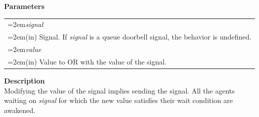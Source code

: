 \documentclass[final]{book}
\newcommand{\hsaarg}[1]{\textit{#1}}
\begin{document}
\noindent\textbf{Parameters}\\[-6mm]
\noindent\begin{longtable}{@{}>{\hangindent=2em}p{\textwidth}}
\hsaarg{signal}\\\hspace{2em}(in) Signal. If \textit{signal} is a queue doorbell signal, the behavior is undefined.\\[2mm]
\hsaarg{value}\\\hspace{2em}(in) Value to OR with the value of the signal.
\end{longtable}
\vspace{-5mm}\noindent\textbf{Description}\\[1mm]
Modifying the value of the signal implies sending the signal. All the agents waiting on \textit{signal} for which the new value satisfies their wait condition are awakened.
\end{document}
